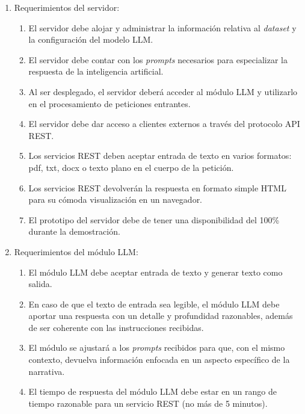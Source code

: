\begin{enumerate}
	\item Requerimientos del servidor:
	      \begin{enumerate}
		      \item El servidor debe alojar y administrar la información relativa al \textit{dataset} y la configuración del modelo LLM.
		      \item El servidor debe contar con los \textit{prompts} necesarios para especializar la respuesta de  la inteligencia artificial.
		      \item Al ser desplegado, el servidor deberá acceder al módulo LLM y utilizarlo en el procesamiento de peticiones entrantes.
		      \item El servidor debe dar acceso a clientes externos a través del protocolo API REST.
		      \item Los servicios REST deben aceptar entrada de texto en varios formatos: pdf, txt, docx o texto plano en el cuerpo de la petición.
		      \item Los servicios REST devolverán la respuesta en formato simple HTML para su cómoda visualización en un navegador.
		      \item El prototipo del servidor debe de tener una disponibilidad del 100\% durante la demostración.
	      \end{enumerate}
	\item Requerimientos del módulo LLM:
	      \begin{enumerate}
		      \item El módulo LLM debe aceptar entrada de texto y generar texto como salida.
		      \item En caso de que el texto de entrada sea legible, el módulo LLM debe aportar una respuesta con un detalle y profundidad razonables,
		            además de ser coherente con las instrucciones recibidas.
		      \item El módulo se ajustará a los \textit{prompts} recibidos para que, con el mismo contexto,
			  		devuelva información enfocada en un aspecto específico de la narrativa.
		      \item El tiempo de respuesta del módulo LLM debe estar en un rango de tiempo razonable para un servicio REST (no más de 5 minutos).
	      \end{enumerate}
\end{enumerate}


